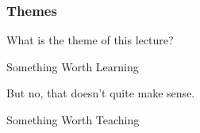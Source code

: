 \documentclass[aspectratio=169, handout]{beamer}
\begin{document}
\begin{frame}[fragile]
  \frametitle{Themes}

  What is the theme of this lecture?

  \pause
  \vspace{\fill}

  \begin{center}
    \large Something Worth Learning
  \end{center}

  \pause
  \vspace{\fill}

  But no, that doesn't quite make sense.

  \pause
  \vspace{\fill}

  \begin{center}
    \large Something Worth Teaching
  \end{center}

  \begin{comment}
    I usually accompany every slide by a simple, short sentence, sort of summarizing
    the idea or thesis of the lecture.

    When I was planning this lecture, I had this one phrase I couldn't get out of my
    head. It was "Something worth learning".

    It sounds good. It seems good. Something worth learning, isn't that exactly
    why I'm here? To teach you something worthwhile?

    But it just felt wrong, and I was having some trouble putting my finger on
    why. But then I thought about it a little bit more and I realized -- what does
    something worth learning really mean? What is something worth learning?

    See, a lot of things are worth learning. It's worth learning to play piano. It's
    worth learning Microsoft Excel. It's worth learning how to do your taxes properly.
    That doesn't stop me from procrastinating all of them, though.
    There's a hundred million things out there worth learning. But that's not
    what gets me out of bed in the morning. That's not what inspires me with passion,
    with confidence, with the energy needed to go out and do something with my day.
    That's not inspiration -- that's decision paralysis.

    So what does get me out of my bed? What causes me, against all odds, to go out
    and do something with my life, even when all the odds are saying that I should
    stay home and lie in bed?
    What I realized to myself is, yes, 150 is something worth learning. But that's
    not something special, that's not doing it justice.
    150 is something worth teaching.
  \end{comment}
\end{frame}
\end{document}
